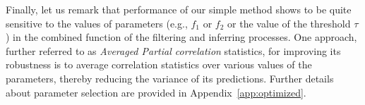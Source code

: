 \documentclass[wcp]{jmlr}
\begin{document}
Finally, let us remark that performance of our simple method shows to
be quite sensitive to the values of parameters (e.g., $f_1$ or $f_2$
or the value of the threshold $\tau$) in the combined function of the
filtering and inferring processes. One approach, further referred
to as \textit{Averaged Partial correlation} statistics, for improving
its robustness is to average correlation statistics over various
values of the parameters, thereby reducing the variance of its
predictions. Further details about parameter selection are provided in
Appendix~\ref{app:optimized}.






\end{document}
